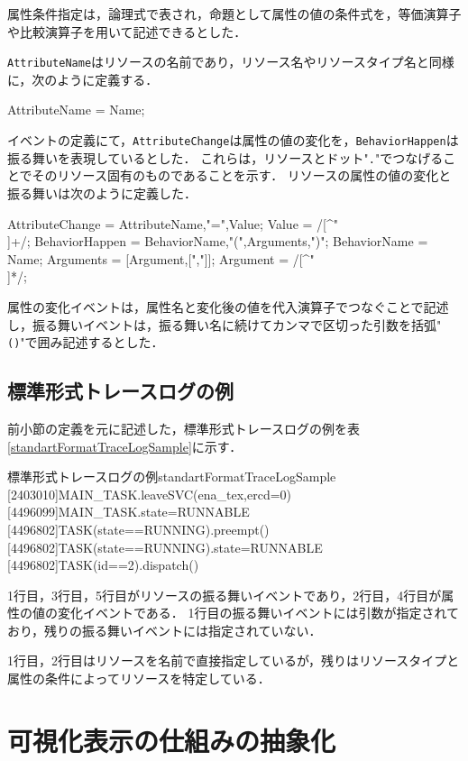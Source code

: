 属性条件指定は，論理式で表され，命題として属性の値の条件式を，等価演算子や比較演算子を用いて記述できるとした．

{\tt AttributeName}はリソースの名前であり，リソース名やリソースタイプ名と同様に，次のように定義する．

\begin{EBNF}
AttributeName = Name;
\end{EBNF}

イベントの定義にて，\verb|AttributeChange|は属性の値の変化を，\verb|BehaviorHappen|は振る舞いを表現しているとした．
これらは，リソースとドット"\verb|.|"でつなげることでそのリソース固有のものであることを示す．
リソースの属性の値の変化と振る舞いは次のように定義した．

\begin{EBNF}
AttributeChange = AttributeName,"=",Value;
Value = /[^"\\]+/;
BehaviorHappen =  BehaviorName,"(",Arguments,")";
BehaviorName = Name;
Arguments = [{Argument,[","]}];
Argument = /[^"\\]*/;
\end{EBNF}

属性の変化イベントは，属性名と変化後の値を代入演算子でつなぐことで記述し，振る舞いイベントは，振る舞い名に続けてカンマで区切った引数を括弧"{\tt ()}"で囲み記述するとした．


\subsection{標準形式トレースログの例}

前小節の定義を元に記述した，標準形式トレースログの例を表\ref{standartFormatTraceLogSample}に示す．

\begin{File}{標準形式トレースログの例}{standartFormatTraceLogSample}
[2403010]MAIN_TASK.leaveSVC(ena_tex,ercd=0)
[4496099]MAIN_TASK.state=RUNNABLE
[4496802]TASK(state==RUNNING).preempt()
[4496802]TASK(state==RUNNING).state=RUNNABLE
[4496802]TASK(id==2).dispatch()
\end{File}

1行目，3行目，5行目がリソースの振る舞いイベントであり，2行目，4行目が属性の値の変化イベントである．
1行目の振る舞いイベントには引数が指定されており，残りの振る舞いイベントには指定されていない．

1行目，2行目はリソースを名前で直接指定しているが，残りはリソースタイプと属性の条件によってリソースを特定している．

\section{可視化表示の仕組みの抽象化}

